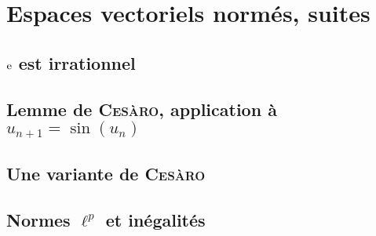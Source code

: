 \chapter{Espaces vectoriels normés, suites}

\section{\texorpdfstring{$\mathrm{e}$}{e} est irrationnel}


\section{Lemme de \textsc{Cesàro}, application à \texorpdfstring{$u_{n+1}=\sin(u_n)$}{u_n+1 = sin(u_n)}}


\section{Une variante de \textsc{Cesàro}}


\section{Normes \texorpdfstring{$\ell^p$}{l^p} et inégalités}



